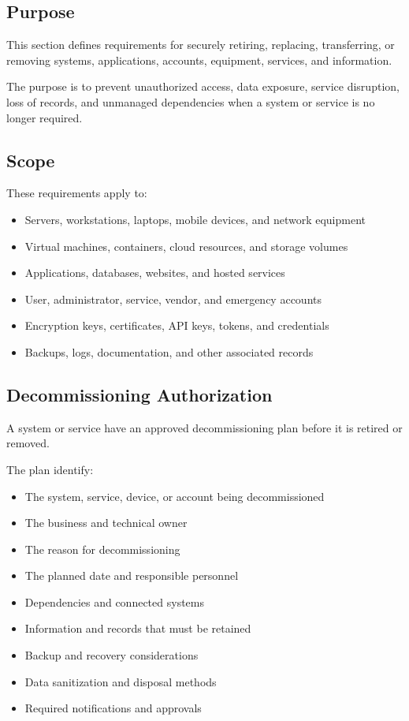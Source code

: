 \subsection{Purpose}

This section defines requirements for securely retiring, replacing, transferring, or removing systems, applications, accounts, equipment, services, and information.

The purpose is to prevent unauthorized access, data exposure, service disruption, loss of records, and unmanaged dependencies when a system or service is no longer required.

\subsection{Scope}

These requirements apply to:
\begin{itemize}
    \item Servers, workstations, laptops, mobile devices, and network equipment
    \item Virtual machines, containers, cloud resources, and storage volumes
    \item Applications, databases, websites, and hosted services
    \item User, administrator, service, vendor, and emergency accounts
    \item Encryption keys, certificates, API keys, tokens, and credentials
    \item Backups, logs, documentation, and other associated records
\end{itemize}

\subsection{Decommissioning Authorization}

A system or service \must{} have an approved decommissioning plan before it is retired or removed.

The plan \must{} identify:
\begin{itemize}
    \item The system, service, device, or account being decommissioned
    \item The business and technical owner
    \item The reason for decommissioning
    \item The planned date and responsible personnel
    \item Dependencies and connected systems
    \item Information and records that must be retained
    \item Backup and recovery considerations
    \item Data sanitization and disposal methods
    \item Required notifications and approvals
\end{itemize}

